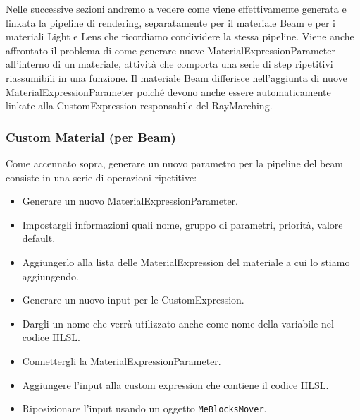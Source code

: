 \documentclass[main.tex]{subfiles}
\begin{document}
Nelle successive sezioni andremo a vedere come viene effettivamente generata e linkata la pipeline di rendering, separatamente per il materiale Beam e per i materiali Light e Lens che ricordiamo condividere la stessa pipeline. Viene anche affrontato il problema di come generare nuove MaterialExpressionParameter all'interno di un materiale, attività che comporta una serie di step ripetitivi riassumibili in una funzione. Il materiale Beam differisce nell'aggiunta di nuove MaterialExpressionParameter poiché devono anche essere automaticamente linkate alla CustomExpression responsabile del RayMarching.

\subsubsection{Custom Material (per Beam)}\label{subsec:2_3_CM}
Come accennato sopra, generare un nuovo parametro per la pipeline del beam consiste in una serie di operazioni ripetitive:
\begin{itemize}
    \item Generare un nuovo MaterialExpressionParameter.
    \item Impostargli informazioni quali nome, gruppo di parametri, priorità, valore default.
    \item Aggiungerlo alla lista delle MaterialExpression del materiale a cui lo stiamo aggiungendo.
    \item Generare un nuovo input per le CustomExpression.
    \item Dargli un nome che verrà utilizzato anche come nome della variabile nel codice HLSL.
    \item Connettergli la MaterialExpressionParameter.
    \item Aggiungere l'input alla custom expression che contiene il codice HLSL.
    \item Riposizionare l'input usando un oggetto \lstinline{MeBlocksMover}.
\end{itemize}
\end{document}
